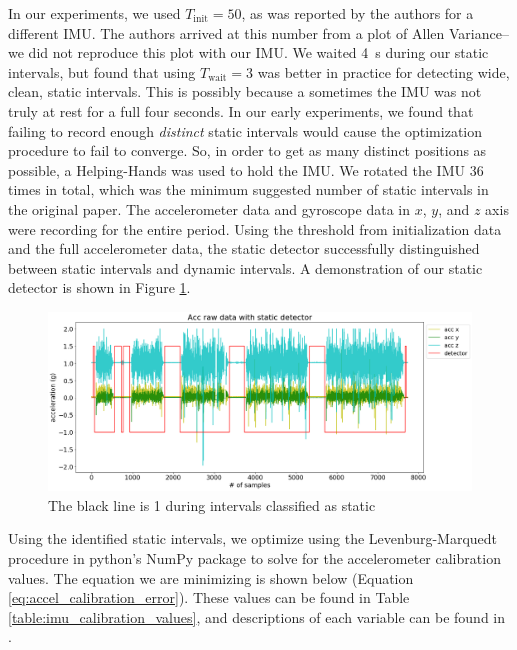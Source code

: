 \documentclass{article}
\begin{document}
    In our experiments, we used $T_{\text{init}}=50$, as was reported by the authors for a different IMU. The authors arrived at this number from a plot of Allen Variance--we did not reproduce this plot with our IMU. We waited \SI{4}{\second} during our static intervals, but found that using $T_{\text{wait}}=3$ was better in practice for detecting wide, clean, static intervals. This is possibly because a sometimes the IMU was not truly at rest for a full four seconds. In our early experiments, we found that failing to record enough \textit{distinct} static intervals would cause the optimization procedure to fail to converge. So, in order to get as many distinct positions as possible, a Helping-Hands was used to hold the IMU. We rotated the IMU 36 times in total, which was the minimum suggested number of static intervals in the original paper. The accelerometer data and gyroscope data in $x$, $y$, and $z$ axis were recording for the entire period. Using the threshold from initialization data and the full accelerometer data, the static detector successfully distinguished between static intervals and dynamic intervals. A demonstration of our static detector is shown in Figure \ref{fig:static_detector}.

    \begin{figure}[H]
      \centering
      \includegraphics[width=1\linewidth]{./images/static_detector.png}
      \caption{The black line is 1 during intervals classified as static}
      \label{fig:static_detector}
    \end{figure}

    Using the identified static intervals, we optimize using the Levenburg-Marquedt procedure in python's NumPy package to solve for the accelerometer calibration values. The equation we are minimizing is shown below (Equation \ref{eq:accel_calibration_error}). These values can be found in Table \ref{table:imu_calibration_values}, and descriptions of each variable can be found in \cite{tedaldi_robust_2014}.
\end{document}
